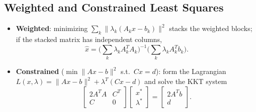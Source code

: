 \documentclass[hidelinks]{article}
\begin{document}
\subsection{Weighted and Constrained Least Squares}
\begin{itemize}
    \item \textbf{Weighted}: minimizing $\sum_k \|\lambda_k(A_kx - b_k)\|^2$ stacks the weighted blocks; if the stacked matrix has independent columns,
    \[
        \hat x = \Big(\textstyle\sum_k \lambda_k A_k^TA_k\Big)^{-1}\Big(\textstyle\sum_k \lambda_k A_k^Tb_k\Big).
    \]
    \item \textbf{Constrained} ($\min\|Ax-b\|^2$ s.t.\ $Cx=d$): form the Lagrangian $L(x,\lambda) = \|Ax-b\|^2 + \lambda^T(Cx-d)$ and solve the KKT system
    \[
        \begin{bmatrix} 2A^TA & C^T\\ C & 0\end{bmatrix}\begin{bmatrix}x^{*}\\ \lambda^{*}\end{bmatrix} = \begin{bmatrix}2A^Tb\\ d\end{bmatrix}.
    \]
\end{itemize}

\end{document}
